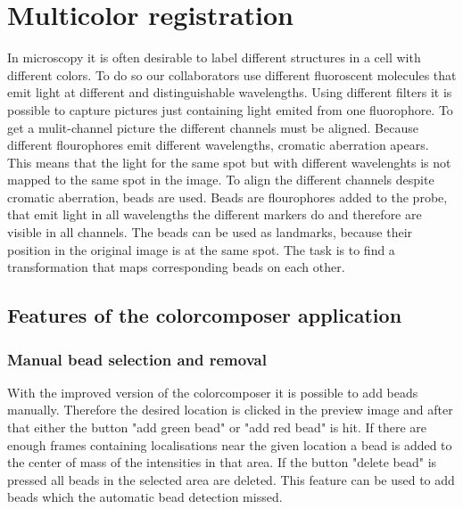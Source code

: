 \chapter{Multicolor registration}
In microscopy it is often desirable to label different structures in a cell with
different colors. To do so our collaborators use different fluoroscent molecules
that emit light at different and distinguishable wavelengths. Using different
filters it is possible to capture pictures just containing light emited from one
fluorophore. To get a mulit-channel picture the different channels must be
aligned. Because different flourophores emit different wavelengths, cromatic
aberration apears. This means that the light for the same spot but with
different wavelenghts is not mapped to the same spot in the image. To align the
different channels despite cromatic aberration, beads are used. Beads are
flourophores added to the probe, that emit light in all wavelengths the
different markers do and therefore are visible in all channels. The beads can be
used as landmarks, because their position in the original image is at the same
spot. The task is to find a transformation that maps corresponding beads on each
other.
\section{Features of the colorcomposer application}
\subsection{Manual bead selection and removal}
With the improved version of the colorcomposer it is possible to add beads manually. Therefore the desired location is clicked in the preview image and after that either the button "add green bead" or "add red bead" is hit. If there are enough frames containing localisations near the given location a bead is added to the center of mass of the intensities in that area. If the button "delete bead" is pressed all beads in the selected area are deleted.\newline
This feature can be used to add beads which the automatic bead detection missed.
